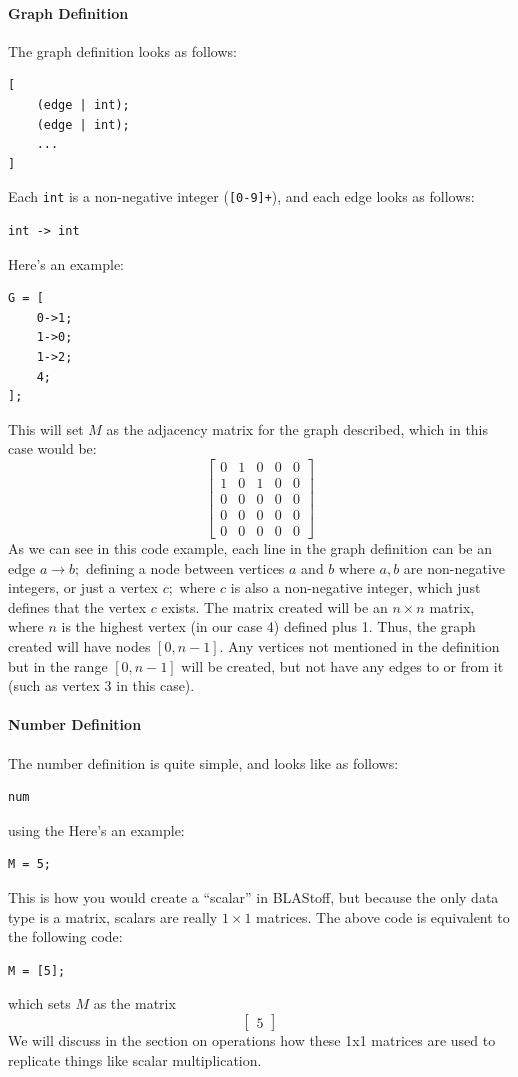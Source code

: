 \paragraph{Graph Definition}
The graph definition looks as follows:
\begin{lstlisting}
[
    (edge | int);
    (edge | int);
    ...
]
\end{lstlisting}
Each \verb=int= is a non-negative integer (\verb=[0-9]+=), and each edge looks as follows:
\begin{lstlisting}
int -> int
\end{lstlisting}
Here's an example:
\begin{lstlisting}
G = [
    0->1;
    1->0;
    1->2;
    4;
];
\end{lstlisting}
This will set $M$ as the adjacency matrix for the graph described, which in this case would be: $$\begin{bmatrix}0&1&0&0&0\\1&0&1&0&0\\0&0&0&0&0\\0&0&0&0&0\\0&0&0&0&0\end{bmatrix}$$  As we can see in this code example, each line in the graph definition can be an edge $a\to b;$ defining a node between vertices $a$ and $b$ where $a,b$ are non-negative integers, or just a vertex $c;$ where $c$ is also a non-negative integer, which just defines that the vertex $c$ exists.  The matrix created will be an $n \times n$ matrix, where $n$ is the highest vertex (in our case 4) defined plus 1.  Thus, the graph created will have nodes $[0,n-1]$.  Any vertices not mentioned in the definition but in the range $[0,n-1]$ will be created, but not have any edges to or from it (such as vertex 3 in this case). 

\paragraph{Number Definition}
The number definition is quite simple, and looks like as follows:
\begin{lstlisting}
num
\end{lstlisting}
using the
Here's an example:
\begin{lstlisting}
M = 5;
\end{lstlisting}
This is how you would create a  ``scalar'' in BLAStoff, but because the only data type is a matrix, scalars are really $1\times 1$ matrices.  The above code is equivalent to the following code:
\begin{lstlisting}
M = [5];
\end{lstlisting}
which sets $M$ as the matrix $$\begin{bmatrix}5\end{bmatrix}$$
We will discuss in the section on operations how these 1x1 matrices are used to replicate things like scalar multiplication.

